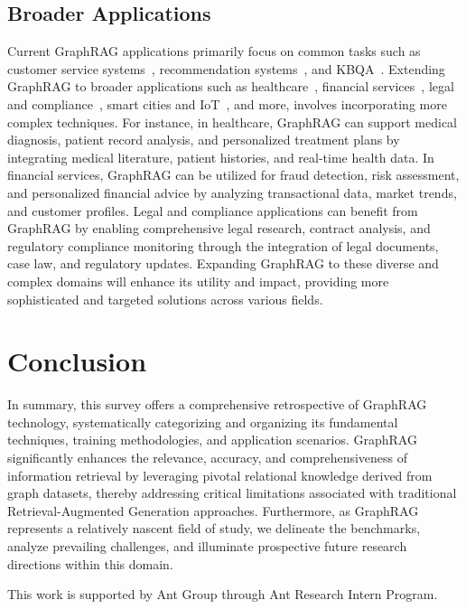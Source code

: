 \documentclass[acmsmall]{acmart}
\begin{document}
\subsection{Broader Applications}
Current GraphRAG applications primarily focus on common tasks such as customer service systems~\cite{ref:noname1}, recommendation systems~\cite{ref:rrs}, and KBQA~\cite{ref:kbqasurvey1}. Extending GraphRAG to broader applications such as healthcare~\cite{ref:kashyap2024knowledge}, financial services~\cite{ref:financial}, legal and compliance~\cite{ref:legal}, smart cities and IoT~\cite{ref:iot}, and more, involves incorporating more complex techniques.
For instance, in healthcare, GraphRAG can support medical diagnosis, patient record analysis, and personalized treatment plans by integrating medical literature, patient histories, and real-time health data. In financial services, GraphRAG can be utilized for fraud detection, risk assessment, and personalized financial advice by analyzing transactional data, market trends, and customer profiles. Legal and compliance applications can benefit from GraphRAG by enabling comprehensive legal research, contract analysis, and regulatory compliance monitoring through the integration of legal documents, case law, and regulatory updates.
Expanding GraphRAG to these diverse and complex domains will enhance its utility and impact, providing more sophisticated and targeted solutions across various fields.

\section{Conclusion}
\label{sec:conclusion}
In summary, this survey offers a comprehensive retrospective of GraphRAG technology, systematically categorizing and organizing its fundamental techniques, training methodologies, and application scenarios. GraphRAG significantly enhances the relevance, accuracy, and comprehensiveness of information retrieval by leveraging pivotal relational knowledge derived from graph datasets, thereby addressing critical limitations associated with traditional Retrieval-Augmented Generation approaches. Furthermore, as GraphRAG represents a relatively nascent field of study, we delineate the benchmarks, analyze prevailing challenges, and illuminate prospective future research directions within this domain.

\begin{acks}
This work is supported by Ant Group through Ant Research Intern Program.
\end{acks}




\end{document}

